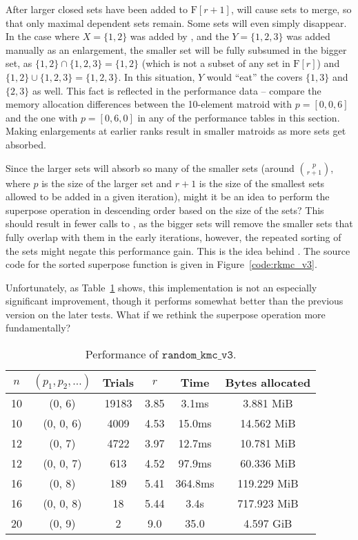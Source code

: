 After larger closed sets have been added to $\mathrm{F}[r+1]$,  will cause sets to merge, so that only maximal dependent sets remain. Some sets will even simply disappear. In the case where $X=\{1,2\}$ was added by , and the $Y=\{1,2,3\}$ was added manually as an enlargement, the smaller set will be fully subsumed in the bigger set, as $\{1,2\}\cap\{1,2,3\}=\{1,2\}$ (which is not a subset of any set in $\mathrm{F}[r]$) and $\{1,2\}\cup\{1,2,3\}=\{1,2,3\}$. In this situation, $Y$ would ``eat'' the covers $\{1,3\}$ and $\{2,3\}$ as well. This fact is reflected in the performance data -- compare the memory allocation differences between the 10-element matroid with $p=[0,0,6]$ and the one with $p=[0,6,0]$ in any of the performance tables in this section. Making enlargements at earlier ranks result in smaller matroids as more sets get absorbed.

Since the larger sets will absorb so many of the smaller sets (around $\binom{p}{r+1}$, where $p$ is the size of the larger set and $r+1$ is the size of the smallest sets allowed to be added in a given iteration), might it be an idea to perform the superpose operation in descending order based on the size of the sets? This should result in fewer calls to , as the bigger sets will remove the smaller sets that fully overlap with them in the early iterations, however, the repeated sorting of the sets might negate this performance gain. This is the idea behind . The source code for the sorted superpose function is given in Figure~\ref{code:rkmc_v3}.

Unfortunately, as Table~\ref{tab:perf_v3} shows, this implementation is not an especially significant improvement, though it performs somewhat better than the previous version on the later tests. What if we rethink the superpose operation more fundamentally?

\begin{table}
  \centering
  \begin{tabular}{cccccc}
    \toprule
      $n$ & $(p_1, p_2, \ldots)$ & Trials & $r$   & Time    & Bytes allocated \\
    \midrule
      10  & (0, 6)               & 19183  & 3.85  & 3.1ms   & 3.881 MiB     \\
      10  & (0, 0, 6)            & 4009   & 4.53  & 15.0ms  & 14.562 MiB     \\
      12  & (0, 7)               & 4722   & 3.97  & 12.7ms  & 10.781 MiB     \\
      12  & (0, 0, 7)            & 613    & 4.52  & 97.9ms  & 60.336 MiB     \\
      16  & (0, 8)               & 189    & 5.41  & 364.8ms & 119.229 MiB     \\
      16  & (0, 0, 8)            & 18     & 5.44  & 3.4s    & 717.923 MiB     \\
      20  & (0, 9)               & 2      & 9.0   & 35.0    & 4.597 GiB     \\
      \bottomrule
    \end{tabular}
  \caption{Performance of $\texttt{random\_kmc\_v3}$.}
  \label{tab:perf_v3}
\end{table}


